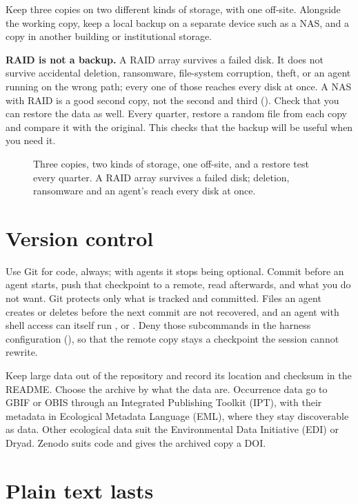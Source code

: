 Keep three copies on two different kinds of storage, with one off-site.
Alongside the working copy, keep a local backup on a separate device such as
a NAS, and a copy in another building or institutional storage.

\textbf{RAID is not a backup.} A RAID array survives a failed disk. It does not
survive accidental deletion, ransomware, file-system corruption, theft, or an
agent running  on the wrong path; every one of those reaches every
disk at once. A NAS with RAID is a good second copy, not the second and third
().
Check that you can restore the data as well. Every quarter, restore a random
file from each copy and compare it with the original. This checks that the
backup will be useful when you need it.

\begin{figure}[htbp]
\centering
{}
\caption{Three copies, two kinds of storage, one off-site, and a restore test
every quarter. A RAID array survives a failed disk; deletion, ransomware and an
agent's  reach every disk at once.}
\label{fig:backup}
\end{figure}

\section{Version control}

Use Git for code, always; with agents it stops being optional. Commit before an
agent starts, push that checkpoint to a remote, read 
afterwards, and  what you do not want. Git protects only
what is tracked and committed. Files an agent creates or deletes before the
next commit are not recovered, and an agent with shell access can itself run
,  or .
Deny those subcommands in the harness configuration (),
so that the remote copy stays a checkpoint the session cannot rewrite.

Keep large data out of the repository and record its location and checksum in
the README. Choose the archive by what the data are. Occurrence data go to
GBIF or OBIS through an Integrated Publishing Toolkit (IPT), with their
metadata in Ecological Metadata Language (EML), where they stay discoverable
as data. Other ecological data suit the Environmental Data Initiative (EDI)
or Dryad. Zenodo suits code and gives the archived copy a DOI.

\section{Plain text lasts}

